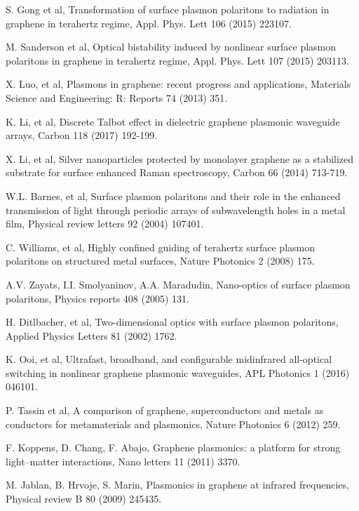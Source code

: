 \documentclass[preprint,12pt,numbers,sort&compress]{elsarticle}
\begin{document}
%
%
\newpage
\begin{thebibliography}{99}
 S. Gong et al, Transformation of surface plasmon polaritons to radiation in graphene in terahertz regime, Appl. Phys. Lett 106 (2015) 223107.

 M. Sanderson et al, Optical bistability induced by nonlinear surface plasmon polaritons in graphene in terahertz regime, Appl. Phys. Lett 107 (2015) 203113.

 X. Luo, et al, Plasmons in graphene: recent progress and applications, Materials Science and Engineering: R: Reports 74 (2013) 351.

 K. Li, et al, Discrete Talbot effect in dielectric graphene plasmonic waveguide arrays, Carbon 118 (2017) 192-199.

 X. Li, et al, Silver nanoparticles protected by monolayer graphene as a stabilized substrate for surface enhanced Raman spectroscopy, Carbon 66 (2014) 713-719.

 W.L. Barnes, et al, Surface plasmon polaritons and their role in the enhanced transmission of light through periodic arrays of subwavelength holes in a metal film, Physical review letters 92 (2004) 107401.

 C. Williams, et al, Highly confined guiding of terahertz surface plasmon polaritons on structured metal surfaces, Nature Photonics 2 (2008) 175.

 A.V. Zayats, I.I. Smolyaninov, A.A. Maradudin, Nano-optics of surface plasmon polaritons, Physics reports 408 (2005) 131.

 H. Ditlbacher, et al, Two-dimensional optics with surface plasmon polaritons, Applied Physics Letters 81 (2002) 1762.

 K. Ooi, et al, Ultrafast, broadband, and configurable midinfrared all-optical switching in nonlinear graphene plasmonic waveguides, APL Photonics 1 (2016) 046101.

 P. Tassin et al, A comparison of graphene, superconductors and metals as conductors for metamaterials and plasmonics, Nature Photonics 6 (2012) 259.

 F. Koppens, D. Chang, F. Abajo, Graphene plasmonics: a platform for strong light–matter interactions, Nano letters 11 (2011) 3370.

 M. Jablan, B. Hrvoje, S. Marin, Plasmonics in graphene at infrared frequencies, Physical review B 80 (2009) 245435.


\end{thebibliography}
\end{document}

